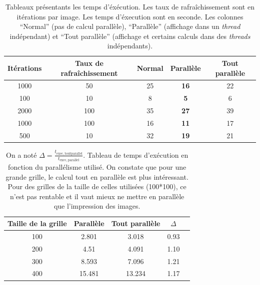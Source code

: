 \begin{table}
  \begin{center}
    \begin{tabular}{|c|c|c|c|c|}
      \hline
      Itérations & Taux de rafraîchissement& Normal & Parallèle &
      Tout parallèle \\
      \hline
      1000&	50&	25&	\textbf{16}&	22\\
      100&	10&	8&	\textbf{5}&	6\\
      2000&	100&	35&	\textbf{27}&	39\\
      1000&	100&	16&	\textbf{11}&	17\\
      500&	10&	32&	\textbf{19}&	21 \\
      \hline
    \end{tabular}
    \caption{Tableaux présentants les temps d'éxécution. Les taux de
      rafraîchissement sont en itérations par image. Les temps
      d'éxecution sont en seconde. Les colonnes ``Normal'' (pas de calcul
      parallèle), ``Parallèle'' (affichage dans un \emph{thread}
      indépendant) et ``Tout parallèle'' (affichage et certains
      calculs dans des \emph{threads} indépendants).}
    \label{optimisation}
  \end{center}
\end{table}
\begin{table}
  \begin{center}
    \begin{tabular}{|c|c|c|c|c|}
      \hline
      Taille de la grille&	Parallèle&	Tout parallèle& $\Delta$\\	
      \hline
      100&	2.801&	3.018&	0.93\\
      200&	4.51&	4.091&	1.10\\
      300&	8.593&	7.096&	1.21\\
      400&	15.481&	13.234&	1.17\\
      \hline
    \end{tabular}
    \caption{On a noté $\Delta = \frac{t_{\mathrm{exec,tout
            parallel}}}{t_{\mathrm{exec,parallel}}}$. Tableau de temps
      d'exécution en fonction du parallélisme utilisé. On
      constate que pour une grande grille, le calcul tout en parallèle
      est plus intéressant. Pour des grilles de la taille de celles
      utilisées (100*100), ce n'est pas rentable et il vaut mieux ne
      mettre en parallèle que l'impression des images.}
    \label{optimisation_parallel}
  \end{center}
\end{table}
		 
